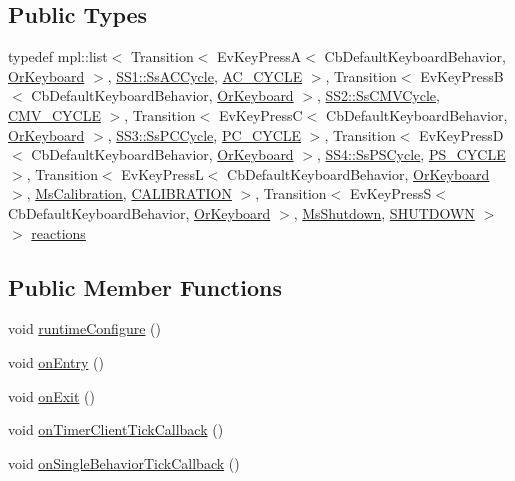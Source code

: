 \subsection*{Public Types}
\begin{DoxyCompactItemize}
\item 
typedef mpl\+::list$<$ Transition$<$ Ev\+Key\+PressA$<$ Cb\+Default\+Keyboard\+Behavior, \hyperlink{classsm__respira__1_1_1OrKeyboard}{Or\+Keyboard} $>$, \hyperlink{structsm__respira__1_1_1SS1_1_1SsACCycle}{S\+S1\+::\+Ss\+A\+C\+Cycle}, \hyperlink{structsm__respira__1_1_1StObserve_1_1AC__CYCLE}{A\+C\+\_\+\+C\+Y\+C\+LE} $>$, Transition$<$ Ev\+Key\+PressB$<$ Cb\+Default\+Keyboard\+Behavior, \hyperlink{classsm__respira__1_1_1OrKeyboard}{Or\+Keyboard} $>$, \hyperlink{structsm__respira__1_1_1SS2_1_1SsCMVCycle}{S\+S2\+::\+Ss\+C\+M\+V\+Cycle}, \hyperlink{structsm__respira__1_1_1StObserve_1_1CMV__CYCLE}{C\+M\+V\+\_\+\+C\+Y\+C\+LE} $>$, Transition$<$ Ev\+Key\+PressC$<$ Cb\+Default\+Keyboard\+Behavior, \hyperlink{classsm__respira__1_1_1OrKeyboard}{Or\+Keyboard} $>$, \hyperlink{structsm__respira__1_1_1SS3_1_1SsPCCycle}{S\+S3\+::\+Ss\+P\+C\+Cycle}, \hyperlink{structsm__respira__1_1_1StObserve_1_1PC__CYCLE}{P\+C\+\_\+\+C\+Y\+C\+LE} $>$, Transition$<$ Ev\+Key\+PressD$<$ Cb\+Default\+Keyboard\+Behavior, \hyperlink{classsm__respira__1_1_1OrKeyboard}{Or\+Keyboard} $>$, \hyperlink{structsm__respira__1_1_1SS4_1_1SsPSCycle}{S\+S4\+::\+Ss\+P\+S\+Cycle}, \hyperlink{structsm__respira__1_1_1StObserve_1_1PS__CYCLE}{P\+S\+\_\+\+C\+Y\+C\+LE} $>$, Transition$<$ Ev\+Key\+PressL$<$ Cb\+Default\+Keyboard\+Behavior, \hyperlink{classsm__respira__1_1_1OrKeyboard}{Or\+Keyboard} $>$, \hyperlink{classsm__respira__1_1_1MsCalibration}{Ms\+Calibration}, \hyperlink{structsm__respira__1_1_1StObserve_1_1CALIBRATION}{C\+A\+L\+I\+B\+R\+A\+T\+I\+ON} $>$, Transition$<$ Ev\+Key\+PressS$<$ Cb\+Default\+Keyboard\+Behavior, \hyperlink{classsm__respira__1_1_1OrKeyboard}{Or\+Keyboard} $>$, \hyperlink{classsm__respira__1_1_1MsShutdown}{Ms\+Shutdown}, \hyperlink{structsm__respira__1_1_1StObserve_1_1SHUTDOWN}{S\+H\+U\+T\+D\+O\+WN} $>$ $>$ \hyperlink{structsm__respira__1_1_1StObserve_a00306e36ae7345cee5a35abc4c88d9c5}{reactions}
\end{DoxyCompactItemize}
\subsection*{Public Member Functions}
\begin{DoxyCompactItemize}
\item 
void \hyperlink{structsm__respira__1_1_1StObserve_a3c1fe027b9396233475e8bd94fed6df7}{runtime\+Configure} ()
\item 
void \hyperlink{structsm__respira__1_1_1StObserve_a4aa08a7d0471453573d7ad4f4d6797ed}{on\+Entry} ()
\item 
void \hyperlink{structsm__respira__1_1_1StObserve_a1491b333b722854794cc61e55ff7015a}{on\+Exit} ()
\item 
void \hyperlink{structsm__respira__1_1_1StObserve_a83c485ad4ae46796d84eb04ddabd97a2}{on\+Timer\+Client\+Tick\+Callback} ()
\item 
void \hyperlink{structsm__respira__1_1_1StObserve_abe113ea6ed3da4ae0d97830bc7dae030}{on\+Single\+Behavior\+Tick\+Callback} ()
\end{DoxyCompactItemize}
